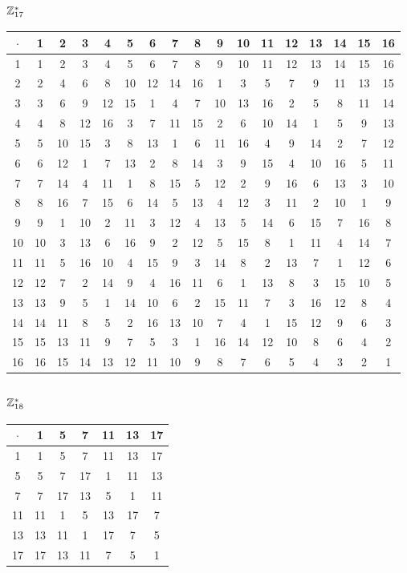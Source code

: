 \subsubsection{$\mathbb{Z}_{17}^*$}
\begin{tabular}{|c|c|c|c|c|c|c|c|c|c|c|c|c|c|c|c|c|}
\hline $\cdot$  & 1 & 2 & 3 & 4 & 5 & 6 & 7 & 8 & 9 & 10 & 11 & 12 & 13 & 14 & 15 & 16\\
\hline 1 & 1 & 2 & 3 & 4 & 5 & 6 & 7 & 8 & 9 & 10 & 11 & 12 & 13 & 14 & 15 & 16\\
\hline 2 & 2 & 4 & 6 & 8 & 10 & 12 & 14 & 16 & 1 & 3 & 5 & 7 & 9 & 11 & 13 & 15\\
\hline 3 & 3 & 6 & 9 & 12 & 15 & 1 & 4 & 7 & 10 & 13 & 16 & 2 & 5 & 8 & 11 & 14\\
\hline 4 & 4 & 8 & 12 & 16 & 3 & 7 & 11 & 15 & 2 & 6 & 10 & 14 & 1 & 5 & 9 & 13\\
\hline 5 & 5 & 10 & 15 & 3 & 8 & 13 & 1 & 6 & 11 & 16 & 4 & 9 & 14 & 2 & 7 & 12\\
\hline 6 & 6 & 12 & 1 & 7 & 13 & 2 & 8 & 14 & 3 & 9 & 15 & 4 & 10 & 16 & 5 & 11\\
\hline 7 & 7 & 14 & 4 & 11 & 1 & 8 & 15 & 5 & 12 & 2 & 9 & 16 & 6 & 13 & 3 & 10\\
\hline 8 & 8 & 16 & 7 & 15 & 6 & 14 & 5 & 13 & 4 & 12 & 3 & 11 & 2 & 10 & 1 & 9\\
\hline 9 & 9 & 1 & 10 & 2 & 11 & 3 & 12 & 4 & 13 & 5 & 14 & 6 & 15 & 7 & 16 & 8\\
\hline 10 & 10 & 3 & 13 & 6 & 16 & 9 & 2 & 12 & 5 & 15 & 8 & 1 & 11 & 4 & 14 & 7\\
\hline 11 & 11 & 5 & 16 & 10 & 4 & 15 & 9 & 3 & 14 & 8 & 2 & 13 & 7 & 1 & 12 & 6\\
\hline 12 & 12 & 7 & 2 & 14 & 9 & 4 & 16 & 11 & 6 & 1 & 13 & 8 & 3 & 15 & 10 & 5\\
\hline 13 & 13 & 9 & 5 & 1 & 14 & 10 & 6 & 2 & 15 & 11 & 7 & 3 & 16 & 12 & 8 & 4\\
\hline 14 & 14 & 11 & 8 & 5 & 2 & 16 & 13 & 10 & 7 & 4 & 1 & 15 & 12 & 9 & 6 & 3\\
\hline 15 & 15 & 13 & 11 & 9 & 7 & 5 & 3 & 1 & 16 & 14 & 12 & 10 & 8 & 6 & 4 & 2\\
\hline 16 & 16 & 15 & 14 & 13 & 12 & 11 & 10 & 9 & 8 & 7 & 6 & 5 & 4 & 3 & 2 & 1\\
\hline
\end{tabular}


\subsubsection{$\mathbb{Z}_{18}^*$}
\begin{tabular}{|c|c|c|c|c|c|c|}
\hline $\cdot$  & 1 & 5 & 7 & 11 & 13 & 17\\
\hline 1 & 1 & 5 & 7 & 11 & 13 & 17\\
\hline 5 & 5 & 7 & 17 & 1 & 11 & 13\\
\hline 7 & 7 & 17 & 13 & 5 & 1 & 11\\
\hline 11 & 11 & 1 & 5 & 13 & 17 & 7\\
\hline 13 & 13 & 11 & 1 & 17 & 7 & 5\\
\hline 17 & 17 & 13 & 11 & 7 & 5 & 1\\
\hline
\end{tabular}


